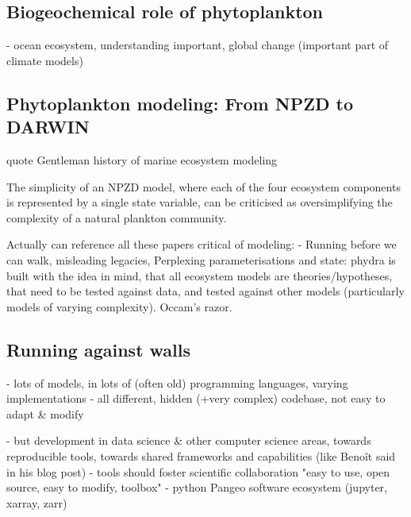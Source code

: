 \documentclass[journal abbreviation, manuscript]{copernicus}
\begin{document}
\introduction  %



\subsection{Biogeochemical role of phytoplankton}
- ocean ecosystem, understanding important, global change (important part of climate models)

\subsection{Phytoplankton modeling: From NPZD to DARWIN}
quote Gentleman history of marine ecosystem modeling

The simplicity of an NPZD model, where each of the four ecosystem components is represented by a single state variable, can be criticised as oversimplifying the complexity of a natural plankton community.

Actually can reference all these papers critical of modeling:
- Running before we can walk, misleading legacies, Perplexing parameterisations
and state: phydra is built with the idea in mind, that all ecosystem models are theories/hypotheses, that need to be tested against data, and tested against other models (particularly models of varying complexity). Occam's razor. 

\subsection{Running against walls}

- lots of models, in lots of (often old) programming languages, varying implementations
- all different, hidden (+very complex) codebase, not easy to adapt \& modify

- but development in data science & other computer science areas, towards reproducible tools, towards shared frameworks and capabilities (like Benoît said in his blog post)
- tools should foster scientific collaboration
"easy to use, open source, easy to modify, toolbox"
- python Pangeo software ecosystem (jupyter, xarray, zarr)
\end{document}
